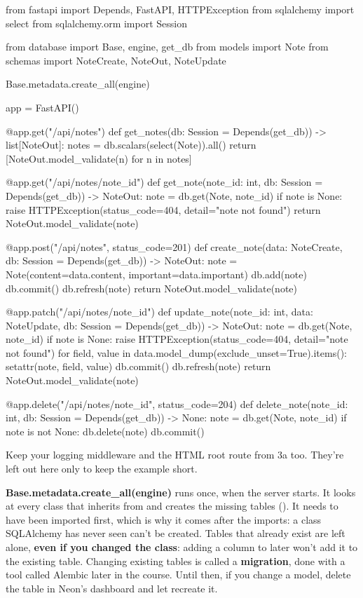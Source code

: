 \begin{py}
from fastapi import Depends, FastAPI, HTTPException
from sqlalchemy import select
from sqlalchemy.orm import Session

from database import Base, engine, get_db
from models import Note
from schemas import NoteCreate, NoteOut, NoteUpdate

Base.metadata.create_all(engine)

app = FastAPI()


@app.get("/api/notes")
def get_notes(db: Session = Depends(get_db)) -> list[NoteOut]:
	notes = db.scalars(select(Note)).all()
	return [NoteOut.model_validate(n) for n in notes]


@app.get("/api/notes/{note_id}")
def get_note(note_id: int, db: Session = Depends(get_db)) -> NoteOut:
	note = db.get(Note, note_id)
	if note is None:
		raise HTTPException(status_code=404, detail="note not found")
	return NoteOut.model_validate(note)


@app.post("/api/notes", status_code=201)
def create_note(data: NoteCreate, db: Session = Depends(get_db)) -> NoteOut:
	note = Note(content=data.content, important=data.important)
	db.add(note)
	db.commit()
	db.refresh(note)
	return NoteOut.model_validate(note)


@app.patch("/api/notes/{note_id}")
def update_note(note_id: int, data: NoteUpdate, db: Session = Depends(get_db)) -> NoteOut:
	note = db.get(Note, note_id)
	if note is None:
		raise HTTPException(status_code=404, detail="note not found")
	for field, value in data.model_dump(exclude_unset=True).items():
		setattr(note, field, value)
	db.commit()
	db.refresh(note)
	return NoteOut.model_validate(note)


@app.delete("/api/notes/{note_id}", status_code=204)
def delete_note(note_id: int, db: Session = Depends(get_db)) -> None:
	note = db.get(Note, note_id)
	if note is not None:
		db.delete(note)
		db.commit()
\end{py}

Keep your logging middleware and the HTML root route from 3a too. They're left out here only to keep the example short.

\textbf{Base.metadata.create\_all(engine)} runs once, when the server starts. It looks at every class that inherits from  and creates the missing tables (). It needs  to have been imported first, which is why it comes after the imports: a class SQLAlchemy has never seen can't be created. Tables that already exist are left alone, \textbf{even if you changed the class}: adding a column to  later won't add it to the existing table. Changing existing tables is called a \textbf{migration}, done with a tool called Alembic later in the course. Until then, if you change a model, delete the table in Neon's dashboard and let  recreate it.

